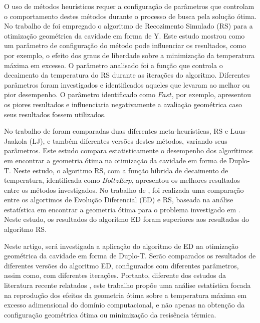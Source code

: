 \documentclass[12pt,A4,A4pt]{article}
\begin{document}
O uso de métodos heurísticos requer a configuração de parâmetros que controlam o comportamento destes métodos durante o processo de busca pela solução ótima. No trabalho de \cite{Gonzales2015energy} foi empregado o algoritmo de Recozimento Simulado (RS) para a otimização geométrica da cavidade em forma de Y. Este estudo mostrou como um parâmetro de configuração do método pode influenciar os resultados, como por exemplo, o efeito dos graus de liberdade sobre a minimização da temperatura máxima em excesso. O parâmetro analisado foi a função que controla o decaimento da temperatura do RS durante as iterações do algoritmo. Diferentes parâmetros foram investigados e identificados aqueles que levaram ao melhor ou pior desempenho. O parâmetro identificado como $Fast$, por exemplo, apresentou os piores resultados e influenciaria negativamente a avaliação geométrica caso seus resultados fossem utilizados. 

No trabalho de \cite{Gonzales2017} foram comparadas duas diferentes meta-heurísticas, RS e Luus-Jaakola (LJ), e também diferentes versões destes métodos, variando seus parâmetros. Este estudo compara estatisticamente o desempenho dos algorítimos em encontrar a geometria ótima na otimização da cavidade em forma de Duplo-T. Neste estudo, o algoritmo RS, com a função híbrida de decaimento de temperatura, identificada como $BoltzExp$, apresentou os melhores resultados entre os métodos investigados. No trabalho de \cite{Gonzales2018}, foi realizada uma comparação entre os algortimos de Evolução Diferencial (ED) e RS, baseada na análise estatística em encontrar a geometria ótima para o problema investigado em \cite{Gonzales2017}. Neste estudo, os resultados do algoritmo ED foram superiores aos resultados do algoritmo RS.

Neste artigo, será investigada a aplicação do algoritmo de ED na otimização geométrica da cavidade em forma de Duplo-T. Serão comparados os resultados de diferentes versões do algoritmo ED, configurados com diferentes parâmetros, assim como, com diferentes iterações. Portanto, diferente dos estudos da literatura recente relatados \citep{Gonzales2017, Gonzales2018}, este trabalho propõe uma análise estatística focada na reprodução dos efeitos da geometria ótima sobre a temperatura máxima em excesso adimensional do domínio computacional, e não apenas na obtenção da configuração geométrica ótima ou minimização da resisência térmica.
\end{document}
